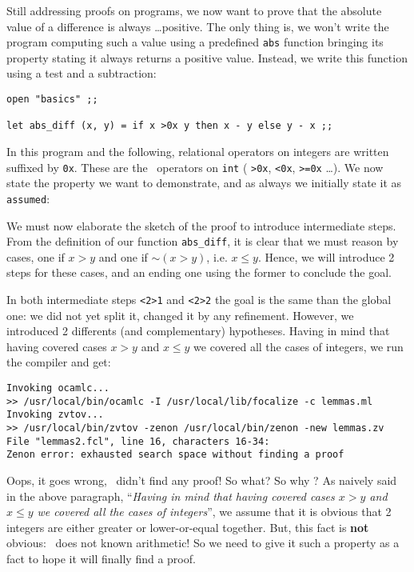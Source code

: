 \documentclass[11pt,a4paper,twoside,onecolumn,fullpage]{article}
\begin{document}
\medskip
Still addressing proofs on programs, we now want to prove that the
absolute value of a difference is always \ldots positive. The only
thing is, we won't write the program computing such a value using a
predefined {\tt abs} function bringing its property stating it always
returns a positive value. Instead, we write this function using a test
and a subtraction:

{\scriptsize
\begin{lstlisting}[caption=lemmas.fcl]
open "basics" ;;

let abs_diff (x, y) = if x >0x y then x - y else y - x ;;
\end{lstlisting}}

In this program and the following, relational operators on integers
are written suffixed by \lstinline{0x}. These are the \focal\
operators on \lstinline{int} ( \lstinline{>0x}, \lstinline{<0x},
\lstinline{>=0x} \ldots). We now state the property we want to
demonstrate, and as always we initially state it as \lstinline{assumed}:

{\scriptsize
}

We must now elaborate the sketch of the proof to introduce
intermediate steps. From the definition of our function
\lstinline"abs_diff", it is clear that we must reason by cases, one if
$x > y$ and one if $\sim (x > y)$, i.e. $x \le y$. Hence, we will
introduce 2 steps for these cases, and an ending one using the former
to conclude the goal.

{\scriptsize
}

In both intermediate steps \lstinline"<2>1" and \lstinline"<2>2" the
goal is the same than the global one: we did not yet split it, changed
it by any refinement. However, we introduced 2 differents (and
complementary) hypotheses.
Having in mind that having covered cases $x > y$
and  $x \le y$ we covered all the cases of integers, we run the
compiler and get:

{\scriptsize
\begin{verbatim}
Invoking ocamlc...
>> /usr/local/bin/ocamlc -I /usr/local/lib/focalize -c lemmas.ml
Invoking zvtov...
>> /usr/local/bin/zvtov -zenon /usr/local/bin/zenon -new lemmas.zv
File "lemmas2.fcl", line 16, characters 16-34:
Zenon error: exhausted search space without finding a proof
\end{verbatim}}

Oops, it goes wrong, \zenon\ didn't find any proof! So what? So why ?
As naively said in the above paragraph, ``{\em Having in mind that having
covered cases $x > y$ and  $x \le y$ we covered all the cases of
integers}'', we assume that it is obvious that 2 integers are either
greater or lower-or-equal together. But, this fact is {\bf not}
obvious: \zenon\ does not known arithmetic! So we need to give it
such a property as a fact to hope it will finally find a proof.
\end{document}
